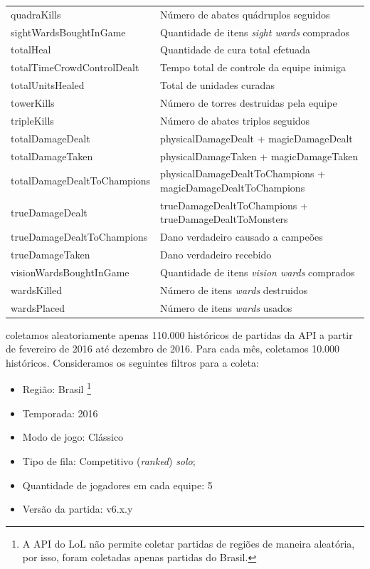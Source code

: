 \begin{table}
\begin{tabular}{p{}p{}}
quadraKills & Número de abates quádruplos seguidos\\
sightWardsBoughtInGame & Quantidade de itens \textit{sight wards} comprados\\
totalHeal & Quantidade de cura total efetuada\\
totalTimeCrowdControlDealt & Tempo total de controle da equipe inimiga\\
totalUnitsHealed & Total de unidades curadas\\
towerKills & Número de torres destruidas pela equipe\\
tripleKills & Número de abates triplos seguidos\\
totalDamageDealt & physicalDamageDealt + magicDamageDealt \\
totalDamageTaken & physicalDamageTaken + magicDamageTaken \\
totalDamageDealtToChampions & physicalDamageDealtToChampions + magicDamageDealtToChampions \\
trueDamageDealt & trueDamageDealtToChampions + trueDamageDealtToMonsters\\
trueDamageDealtToChampions & Dano verdadeiro causado a campeões\\
trueDamageTaken & Dano verdadeiro recebido\\
visionWardsBoughtInGame & Quantidade de itens \textit{vision wards} comprados\\
wardsKilled & Número de itens \textit{wards} destruidos\\
wardsPlaced & Número de itens \textit{wards} usados\\
  \bottomrule
\end{tabular}
\end{table}

 coletamos aleatoriamente apenas 110.000 históricos de partidas da API a partir de fevereiro de 2016 até dezembro de 2016. Para cada mês, coletamos 10.000 históricos. Consideramos os seguintes filtros para a coleta: 

\begin{itemize}
  \item Região: Brasil \footnote{A API do LoL não permite coletar partidas de regiões de maneira aleatória, por isso, foram coletadas apenas partidas do Brasil.}
  \item Temporada: 2016
  \item Modo de jogo: Clássico
  \item Tipo de fila: Competitivo (\textit{ranked}) \textit{solo};
  \item Quantidade de jogadores em cada equipe: 5
  \item Versão da partida: v6.x.y
\end{itemize}

